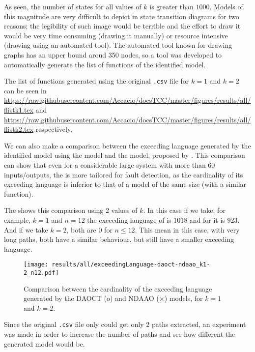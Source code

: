 As seen, the number of states for all values of $k$ is greater than $1000$. Models of this magnitude are very difficult to depict in state transition
diagrams for two reasons; the legibility of such image would be terrible and the
effort to draw it would be very time consuming (drawing it manually) or resource
intensive (drawing using an automated tool). The automated tool known for drawing
graphs has an upper bound aroud 350 nodes, so a tool was developed to
automatically generate the list of \ffunction{} functions of the identified model.

The  list of \ffunction{} functions generated using the original \verb|.csv| file
for $k=1$ and $k=2$
can be seen in  
\url{https://raw.githubusercontent.com/Accacio/docsTCC/master/figures/results/all/flistk1.tex}
and
\url{https://raw.githubusercontent.com/Accacio/docsTCC/master/figures/results/all/flistk2.tex}
respectively.

We can also make a comparison between the exceeding language generated by the
identified model using the \DAOCT{} model and the \NDAAO{} model, proposed by
\cite{klein2005fault}. This comparison can show that even for a considerable
large system with more than 60 inputs\slash outputs, the \DAOCT{} is more
tailored for fault detection, as the cardinality of its exceeding language is
inferior to that of a \NDAAO{} model of the same size (with a similar \ffunction{} function).

The  shows this comparison using 2 values of $k$.
In this case if we take, for example, $k=1$ and $n=12$ the
exceeding language of \NDAAO{} is $1018$ and for \DAOCT{} it is $923$. And
if we take $k=2$, both are $0$ for $n\leq12$. This mean in this case, with very
long paths, both have a similar behaviour, but \DAOCT{} still have a smaller exceeding language.
\begin{figure}[H]
  \centering
  \texttt{[image: results/all/exceedingLanguage-daoct-ndaao\_k1-2\_n12.pdf]}
  \caption{Comparison between the cardinality of the exceeding language generated by the DAOCT (o) and
NDAAO ($\times$) models, for $k=1$ and $k=2$.}
    \label{fig:daoctNdaaoOriginal}
\end{figure}

Since the original \verb|.csv| file only could get only 2 paths extracted, an
experiment was made in order to increase the number of paths and see how
different the generated model would be.

